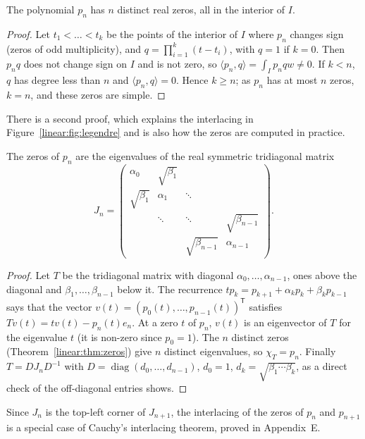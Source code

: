 \begin{theorem}[zeros]\label{linear:thm:zeros}
The polynomial $p_n$ has $n$ distinct real zeros, all in the interior of $I$.
\end{theorem}
\begin{proof}
Let $t_1<\dots<t_k$ be the points of the interior of $I$ where $p_n$ changes sign (zeros of odd multiplicity), and
$q=\prod_{i=1}^k(t-t_i)$, with $q=1$ if $k=0$. Then $p_nq$ does not change sign on $I$ and is not zero, so
$\langle p_n,q\rangle=\int_Ip_nqw\ne0$. If $k<n$, $q$ has degree less than $n$ and $\langle p_n,q\rangle=0$. Hence $k\ge n$;
as $p_n$ has at most $n$ zeros, $k=n$, and these zeros are simple.
\end{proof}

There is a second proof, which explains the interlacing in Figure~\ref{linear:fig:legendre} and is also how the zeros are
computed in practice.

\begin{proposition}\label{linear:prop:jacobi}
The zeros of $p_n$ are the eigenvalues of the real symmetric tridiagonal matrix
\[
J_n=\begin{pmatrix}\alpha_0&\sqrt{\beta_1}&&\\\sqrt{\beta_1}&\alpha_1&\ddots&\\&\ddots&\ddots&\sqrt{\beta_{n-1}}\\
&&\sqrt{\beta_{n-1}}&\alpha_{n-1}\end{pmatrix}.
\]
\end{proposition}
\begin{proof}
Let $T$ be the tridiagonal matrix with diagonal $\alpha_0,\dots,\alpha_{n-1}$, ones above the diagonal and
$\beta_1,\dots,\beta_{n-1}$ below it. The recurrence $tp_k=p_{k+1}+\alpha_kp_k+\beta_kp_{k-1}$ says that the vector
$v(t)=(p_0(t),\dots,p_{n-1}(t))^{\mathsf T}$ satisfies $Tv(t)=tv(t)-p_n(t)e_n$. At a zero $t$ of $p_n$, $v(t)$ is an
eigenvector of $T$ for the eigenvalue $t$ (it is non-zero since $p_0=1$). The $n$ distinct zeros (Theorem~\ref{linear:thm:zeros})
give $n$ distinct eigenvalues, so $\chi_T=p_n$. Finally $T=DJ_nD^{-1}$ with $D=\operatorname{diag}(d_0,\dots,d_{n-1})$,
$d_0=1$, $d_k=\sqrt{\beta_1\cdots\beta_k}$, as a direct check of the off-diagonal entries shows.
\end{proof}

Since $J_n$ is the top-left corner of $J_{n+1}$, the interlacing of the zeros of $p_n$ and $p_{n+1}$ is a special case of
Cauchy's interlacing theorem, proved in Appendix~E.

